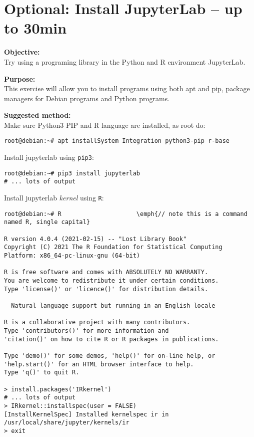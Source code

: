 \documentclass[a4paper,11pt,notitlepage]{report}
\begin{document}
\chapter{Optional: Install JupyterLab -- up to 30min}
\label{ex-python-Jupyterlab}


{\bf Objective:}\\
Try using a programing library in the Python and R environment JupyterLab.

{\bf Purpose:}\\
This exercise will allow you to install programs using both apt and pip, package managers for Debian programs and Python programs.

{\bf Suggested method:}\\
Make sure Python3 PIP and R language are installed, as root do:
\begin{verbatim}
root@debian:~# apt installSystem Integration python3-pip r-base
\end{verbatim}

Install jupyterlab using \verb+pip3+:
\begin{verbatim}
root@debian:~# pip3 install jupyterlab
# ... lots of output
\end{verbatim}

\eject

Install jupyterlab \emph{kernel} using \verb+R+:
\begin{verbatim}
root@debian:~# R                     \emph{// note this is a command named R, single capital}

R version 4.0.4 (2021-02-15) -- "Lost Library Book"
Copyright (C) 2021 The R Foundation for Statistical Computing
Platform: x86_64-pc-linux-gnu (64-bit)

R is free software and comes with ABSOLUTELY NO WARRANTY.
You are welcome to redistribute it under certain conditions.
Type 'license()' or 'licence()' for distribution details.

  Natural language support but running in an English locale

R is a collaborative project with many contributors.
Type 'contributors()' for more information and
'citation()' on how to cite R or R packages in publications.

Type 'demo()' for some demos, 'help()' for on-line help, or
'help.start()' for an HTML browser interface to help.
Type 'q()' to quit R.

> install.packages('IRkernel')
# ... lots of output
> IRkernel::installspec(user = FALSE)
[InstallKernelSpec] Installed kernelspec ir in /usr/local/share/jupyter/kernels/ir
> exit
\end{verbatim}
\end{document}
